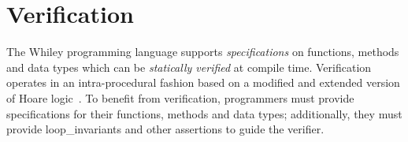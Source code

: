 \chapter{Verification}
The Whiley programming language supports {\em specifications} on functions, methods and data types which can be {\em statically verified} at compile time.  Verification operates in an intra-procedural fashion based on a modified and extended version of Hoare logic~\cite{Hoare69}.  To benefit from verification, programmers must provide specifications for their functions, methods and data types;  additionally, they must provide \gls{loop_invariant}s and other \gls{assertion}s to guide the verifier.

